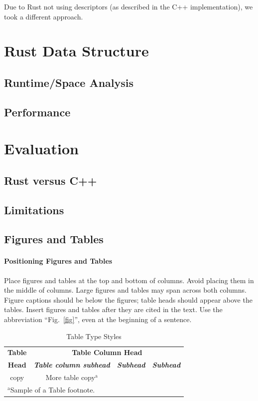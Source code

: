 \documentclass[conference]{IEEEtran}
\begin{document}
Due to Rust not using descriptors (as described in the C++ implementation), we took a different approach. 

\section{Rust Data Structure}

    \subsection{Runtime/Space Analysis}
    
    \subsection{Performance}

\section{Evaluation}

    \subsection{Rust versus C++}
    
    \subsection{Limitations}

\subsection{Figures and Tables}
\paragraph{Positioning Figures and Tables} Place figures and tables at the top and 
bottom of columns. Avoid placing them in the middle of columns. Large 
figures and tables may span across both columns. Figure captions should be 
below the figures; table heads should appear above the tables. Insert 
figures and tables after they are cited in the text. Use the abbreviation 
``Fig.~\ref{fig}'', even at the beginning of a sentence.

\begin{table}[htbp]
\caption{Table Type Styles}
\begin{center}
\begin{tabular}{|c|c|c|c|}
\hline
\textbf{Table}&\multicolumn{3}{|c|}{\textbf{Table Column Head}} \\
\cline{2-4} 
\textbf{Head} & \textbf{\textit{Table column subhead}}& \textbf{\textit{Subhead}}& \textbf{\textit{Subhead}} \\
\hline
copy& More table copy$^{\mathrm{a}}$& &  \\
\hline
\multicolumn{4}{l}{$^{\mathrm{a}}$Sample of a Table footnote.}
\end{tabular}
\label{tab1}
\end{center}
\end{table}
\end{document}
